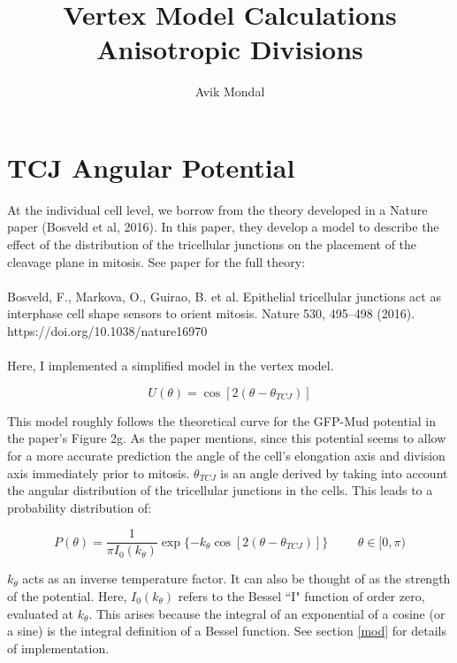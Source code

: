 \documentclass[12pt]{article}
\begin{document}
\title{ Vertex Model Calculations \\ {\normalsize Anisotropic Divisions}}
\author{Avik Mondal}
\maketitle 
\tableofcontents
\section{TCJ Angular Potential}

At the individual cell level, we borrow from the theory developed in a Nature paper (Bosveld et al, 2016). In this paper, they develop a model to describe the effect of the distribution of the tricellular junctions on the placement of the cleavage plane in mitosis. See paper for the full theory: 
\\ \\
Bosveld, F., Markova, O., Guirao, B. et al. Epithelial tricellular junctions act as interphase cell shape sensors to orient mitosis. Nature 530, 495–498 (2016). \\ https://doi.org/10.1038/nature16970 \\ \\

Here, I implemented a simplified model in the vertex model.
\begin{center}
\begin{equation}
U(\theta) = \cos[ 2 (\theta - \theta_{TCJ}) ]
\end{equation}
\end{center} 
This model roughly follows the theoretical curve for the GFP-Mud potential in the paper's Figure 2g. As the paper mentions,  since this potential seems to allow for a more accurate prediction the angle of the cell's elongation axis and division axis immediately prior to mitosis. 
$\theta_{TCJ}$ is an angle derived by taking into account the angular distribution of the tricellular junctions in the cells. This leads to a probability distribution of:
\begin{center}
\begin{equation}
P(\theta) = \frac{1}{\pi I_0(k_{\theta})}\exp\{-k_{\theta}\cos[2(\theta - \theta_{TCJ})]\} \hspace{1cm} \theta \in [0,\pi)
\end{equation}
\end{center}
$k_\theta$ acts as an inverse temperature factor. It can also be thought of as the strength of the potential. Here, $I_0(k_\theta)$ refers to the Bessel ``I" function of order zero, evaluated at $k_\theta$. This arises because the integral of an exponential of a cosine (or a sine) is the integral definition of a Bessel function. See section \ref{mod} for details of implementation.
\end{document}
